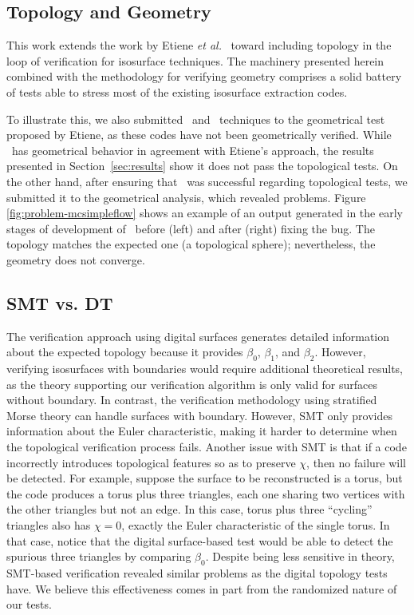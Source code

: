 \subsection{Topology and Geometry}
This work extends the work by Etiene \emph{et al.}~\cite{etiene:tvcg:2009} toward
including topology in the loop of verification for isosurface techniques. 
The machinery presented herein combined with the methodology for verifying
geometry comprises a solid battery of tests able to stress most of the existing 
isosurface extraction codes. 

To illustrate this, we also submitted \mclewiner\ and \mcsimpleflow\ techniques 
to the geometrical test proposed by Etiene, as these codes have not been 
geometrically verified. While \mclewiner\ has geometrical
behavior in agreement with Etiene's approach, the results presented in Section~\ref{sec:results} 
show it does not pass the topological tests. 
On the other hand, after ensuring that 
\mcsimpleflow\ was successful regarding topological tests, 
we submitted it to the geometrical analysis, which revealed problems.
Figure \ref{fig:problem-mcsimpleflow} shows an
example of an output generated in the early stages of development of \mcsimpleflow\ before (left) and after
(right) fixing the bug. The topology matches the expected one (a
topological sphere); nevertheless, the geometry does not converge. 

\subsection{SMT vs. DT}
The verification approach using digital surfaces generates detailed
information about the expected topology because it provides $\beta_0$, $\beta_1$, and $\beta_2$. 
However, verifying isosurfaces with boundaries would require
additional theoretical results, as the theory supporting our verification
algorithm is only valid for surfaces without boundary.
%
In contrast, the verification methodology using stratified Morse theory can handle
surfaces with boundary. However, SMT only provides information 
about the Euler characteristic, making it harder to determine when the topological verification process fails.
%
Another issue with SMT is that if a code incorrectly introduces topological features so as
to preserve $\chi$, then no failure will be detected. For example, suppose the surface to
be reconstructed is a torus, but the code produces a torus plus three triangles,
each one sharing two vertices with the other triangles but not an edge. In this case, 
torus plus three ``cycling'' triangles also has $\chi = 0$, exactly the Euler characteristic of the single torus.
In that case, notice that the digital surface-based test would be able to
detect the spurious three triangles by comparing $\beta_0$.
Despite being less sensitive in theory, 
SMT-based verification revealed similar problems as the digital topology tests have. 
We believe this effectiveness comes in part from 
the randomized nature of our tests.

